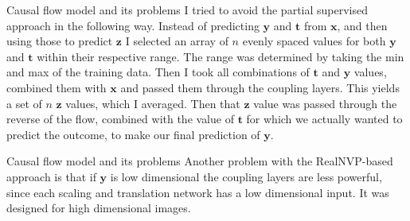 \documentclass{beamer}
\newcommand{\bt}{\mathbf{t}}
\newcommand{\bx}{\mathbf{x}}
\newcommand{\by}{\mathbf{y}}
\newcommand{\bz}{\mathbf{z}}
\begin{document}
	\begin{frame}{Causal flow model and its problems}
	    I tried to avoid the partial supervised approach in the following way. Instead of predicting $\by$ and $\bt$ from $\bx$, and then using those to predict $\bz$ I selected an array of $n$ evenly spaced values for both $\by$ and $\bt$ within their respective range. The range was determined by taking the min and max of the training data.
	    Then I took all combinations of $\bt$ and $\by$ values, combined them with $\bx$ and passed them through the coupling layers. This yields a set of $n$ $\bz$ values, which I averaged. 
	    Then that $\bz$ value was passed through the reverse of the flow, combined with the value of $\bt$ for which we actually wanted to predict the outcome, to make our final prediction of $\by$.
	\end{frame}
	
	\begin{frame}{Causal flow model and its problems}
	    Another problem with the RealNVP-based approach is that if $\by$ is low dimensional the coupling layers are less powerful, since each scaling and translation network has a low dimensional input. It was designed for high dimensional images.
	\end{frame}
	
\end{document}
